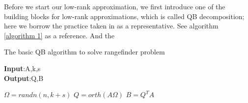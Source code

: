 \documentclass{article}
\begin{document}






Before we start our low-rank approximation, we first introduce one of the building blocks for low-rank approximations, which is called QB decomposition; here we borrow the practice taken in \cite{yu2018efficientrandomizedalgorithmsfixedprecision} as a representative. See algorithm \ref{algorithm 1} as a reference. And the
\begin{algorithm}
	\caption{The basic QB algorithm to solve rangefinder problem} 
    \textbf{Input}:A,k,s\\
    \textbf{Output}:Q,B
	\begin{algorithmic}[1]
		\State$\Omega=randn(n,k+s)$
        \State$Q=orth(A\Omega)$
        \State$B=Q^TA$
	\end{algorithmic} 
    \label{algorithm 1}
\end{algorithm}
\end{document}
